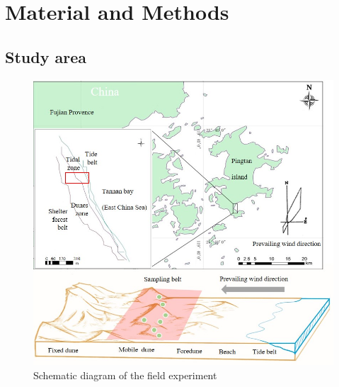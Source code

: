 \documentclass[]{interact}
\theoremstyle{plain}%
\theoremstyle{definition}
\theoremstyle{remark}
\begin{document}
\section{Material and Methods}
\subsection{Study area}

\begin{figure}
  \centering
  \includegraphics[scale=0.8]{../figs/study_area.jpg}
  \caption{Schematic diagram of the field experiment} 
  \label{fig:map}
\end{figure}
\end{document}
